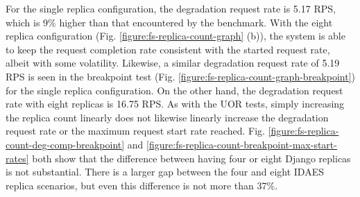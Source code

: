 For the single replica configuration, the degradation request rate is 5.17 RPS, which is 9\% higher than that encountered by the benchmark. With the eight replica configuration (Fig. \ref{figure:fs-replica-count-graph} (b)), the system is able to keep the request completion rate consistent with the started request rate, albeit with some volatility. Likewise, a similar degradation request rate of 5.19 RPS is seen in the breakpoint test (Fig. \ref{figure:fs-replica-count-graph-breakpoint}) for the single replica configuration. On the other hand, the degradation request rate with eight replicas is 16.75 RPS. As with the UOR tests, simply increasing the replica count linearly does not likewise linearly increase the degradation request rate or the maximum request start rate reached. Fig. \ref{figure:fs-replica-count-deg-comp-breakpoint} and \ref{figure:fs-replica-count-breakpoint-max-start-rates} both show that the difference between having four or eight Django replicas is not substantial. There is a larger gap between the four and eight IDAES replica scenarios, but even this difference is not more than 37\%.

